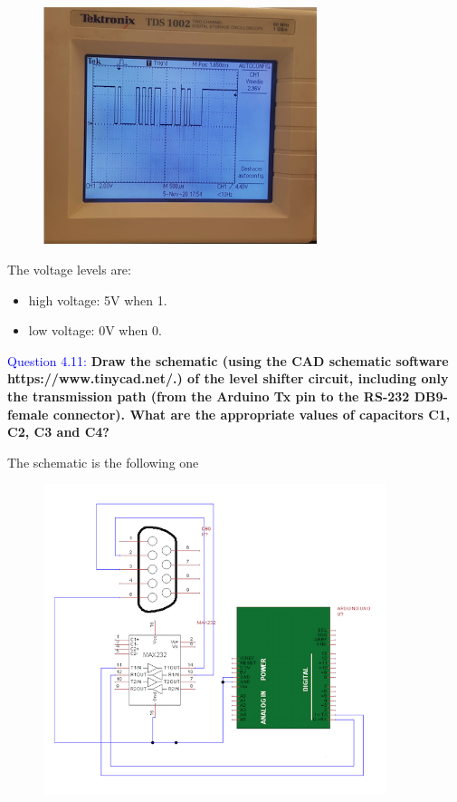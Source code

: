 \documentclass[12pt, a4papre]{article}
\begin{document}
	\begin{figure}[H]
		\begin{center}
		\includegraphics[width=80mm]{LletraA_Arduino.png}
		\end{center}
	\end{figure}
	The voltage levels are: 
	\begin{itemize}
		\item high voltage: 5V when 1.
		\item low voltage: 0V when 0.
	\end{itemize}
	
	
	\textcolor{blue}{Question 4.11:} \textbf{Draw the schematic (using the CAD schematic software https://www.tinycad.net/.) of the level shifter circuit, including only the transmission path (from the Arduino Tx pin to the RS-232 DB9-female connector). What are the appropriate values of capacitors C1, C2, C3 and C4?}
	
	The schematic is the following one
	
	\begin{figure}[H]
		\begin{center}
		\includegraphics[width=100mm]{tinycadWP4.png}
		\end{center}
	\end{figure}
	
\end{document}
